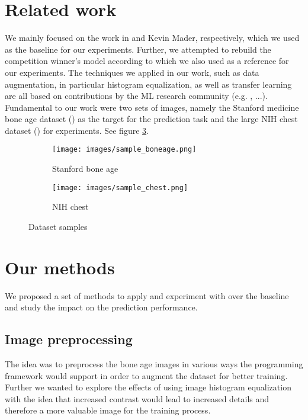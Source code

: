\documentclass[10pt,twocolumn,letterpaper]{article}
\begin{document}
\section{Related work}
We mainly focused on the work in \cite{kaggleboneage} and Kevin Mader, respectively, which we used as the baseline for our experiments. Further, we attempted to rebuild the competition winner's model according to \cite{16bitrsnachallenge} which we also used as a reference for our experiments. The techniques we applied in our work, such as data augmentation, in particular histogram equalization, as well as transfer learning are all based on contributions by the ML research community (e.g. \cite{1411.1792}, ...). \\
Fundamental to our work were two sets of images, namely the Stanford medicine bone age dataset (\cite{stanfordboneage}) as the target for the prediction task and the large NIH chest dataset (\cite{nihchestxray}) for experiments. See figure \ref{fig:imgdss}.

\begin{figure}[h]
\begin{subfigure}{0.2\textwidth}
\texttt{[image: images/sample\_boneage.png]} 
\caption{Stanford bone age}
\label{fig:subim1}
\end{subfigure}
\begin{subfigure}{0.2\textwidth}
\texttt{[image: images/sample\_chest.png]}
\caption{NIH chest}
\label{fig:subim2}
\end{subfigure}
\caption{Dataset samples}
\label{fig:imgdss}
\end{figure}


\section{Our methods}
We proposed a set of methods to apply and experiment with over the baseline and study the impact on the prediction performance.

\subsection{Image preprocessing}
The idea was to preprocess the bone age images in various ways the programming framework would support in order to augment the dataset for better training. Further we wanted to explore the effects of using image histogram equalization with the idea that increased contrast would lead to increased details and therefore a more valuable image for the training process.
\end{document}
